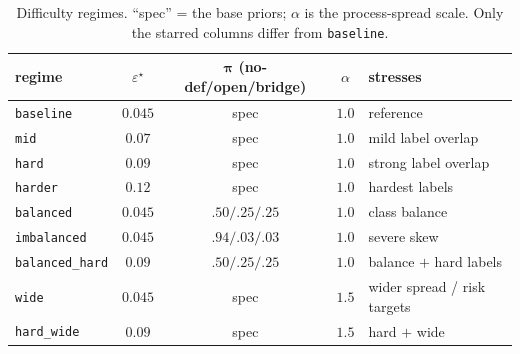 \begin{table}[t]
    \centering
    \caption{Difficulty regimes. ``spec'' = the base priors; $\alpha$ is the process-spread
    scale. Only the starred columns differ from \texttt{baseline}.}
    \label{tab:regimes}
    \begin{tabular}{l c c c l}
        \hline
        regime & $\varepsilon^\star$ & $\bm\pi$ (no-def/open/bridge) & $\alpha$ & stresses \\
        \hline
        \texttt{baseline}      & $0.045$ & spec              & $1.0$ & reference \\
        \texttt{mid}           & $0.07$  & spec              & $1.0$ & mild label overlap \\
        \texttt{hard}          & $0.09$  & spec              & $1.0$ & strong label overlap \\
        \texttt{harder}        & $0.12$  & spec              & $1.0$ & hardest labels \\
        \texttt{balanced}      & $0.045$ & $.50/.25/.25$     & $1.0$ & class balance \\
        \texttt{imbalanced}    & $0.045$ & $.94/.03/.03$     & $1.0$ & severe skew \\
        \texttt{balanced\_hard}& $0.09$  & $.50/.25/.25$     & $1.0$ & balance $+$ hard labels \\
        \texttt{wide}          & $0.045$ & spec              & $1.5$ & wider spread / risk targets \\
        \texttt{hard\_wide}    & $0.09$  & spec              & $1.5$ & hard $+$ wide \\
        \hline
    \end{tabular}
\end{table}
